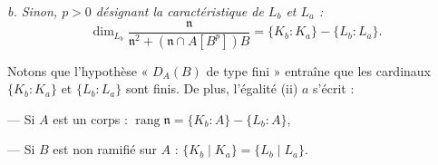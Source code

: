 \textit{b. Sinon, $p>0$ désignant la caractéristique de $L_b$ et $L_a$ :}
\[
\dim_{L_b}\frac{\mathfrak n}{\mathfrak n^2+(\mathfrak n\cap A[B^p])B}=\{K_b:K_a\}-\{L_b:L_a\}.
\]

Notons que l'hypothèse « $D_A(B)$ de type fini » entraîne que les cardinaux $\{K_b:K_a\}$ et $\{L_b:L_a\}$ sont finis. De plus, l'égalité (ii) $a$ s'écrit :

--- Si $A$ est un corps : $\operatorname{rang}\mathfrak n=\{K_b:A\}-\{L_b:A\}$,

--- Si $B$ est non ramifié sur $A$ : $\{K_b\mid K_a\}=\{L_b\mid L_a\}$.

